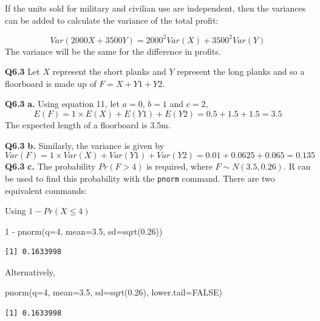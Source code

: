 \documentclass[
  oneside]{krantz}
\newenvironment{Shaded}{\begin{snugshade}}{\end{snugshade}}
\newcommand{\AttributeTok}[1]{\textcolor[rgb]{0.77,0.63,0.00}{#1}}
\newcommand{\ConstantTok}[1]{\textcolor[rgb]{0.00,0.00,0.00}{#1}}
\newcommand{\DecValTok}[1]{\textcolor[rgb]{0.00,0.00,0.81}{#1}}
\newcommand{\FloatTok}[1]{\textcolor[rgb]{0.00,0.00,0.81}{#1}}
\newcommand{\FunctionTok}[1]{\textcolor[rgb]{0.00,0.00,0.00}{#1}}
\newcommand{\NormalTok}[1]{#1}
\newcommand{\SpecialCharTok}[1]{\textcolor[rgb]{0.00,0.00,0.00}{#1}}
\begin{document}
If the units sold for military and civilian use are independent, then the variances can be added to calculate the variance of the total profit:

\[Var(2000X + 3500Y) = 2000^2Var(X) + 3500^2Var(Y)\]
The variance will be the same for the difference in profits.

\textbf{Q6.3} Let \(X\) represent the short planks and \(Y\) represent the long planks and so a floorboard is made up of \(F = X + Y1 + Y2\).

\textbf{Q6.3} \textbf{a.} Using equation 11, let \(a=0\), \(b=1\) and \(c=2\),
\[E(F) = 1 \times E(X) + E(Y1) + E(Y2) = 0.5 + 1.5 + 1.5 = 3.5\]
The expected length of a floorboard is 3.5m.

\textbf{Q6.3} \textbf{b.} Similarly, the variance is given by
\[Var(F) = 1 \times Var(X) + Var(Y1) + Var(Y2) = 0.01 + 0.0625 + 0.065 = 0.135\]
\textbf{Q6.3} \textbf{c.} The probability \(Pr(F > 4)\) is required, where \(F \sim N(3.5, 0.26)\). R can be used to find this probability with the \texttt{pnorm} command. There are two equivalent commands:

Using \(1 - Pr(X \le 4)\)

\begin{Shaded}
\begin{Highlighting}[]
\DecValTok{1} \SpecialCharTok{{-}} \FunctionTok{pnorm}\NormalTok{(}\AttributeTok{q=}\DecValTok{4}\NormalTok{, }\AttributeTok{mean=}\FloatTok{3.5}\NormalTok{, }\AttributeTok{sd=}\FunctionTok{sqrt}\NormalTok{(}\FloatTok{0.26}\NormalTok{))}
\end{Highlighting}
\end{Shaded}

\begin{verbatim}
[1] 0.1633998
\end{verbatim}

Alternatively,

\begin{Shaded}
\begin{Highlighting}[]
\FunctionTok{pnorm}\NormalTok{(}\AttributeTok{q=}\DecValTok{4}\NormalTok{, }\AttributeTok{mean=}\FloatTok{3.5}\NormalTok{, }\AttributeTok{sd=}\FunctionTok{sqrt}\NormalTok{(}\FloatTok{0.26}\NormalTok{), }\AttributeTok{lower.tail=}\ConstantTok{FALSE}\NormalTok{)}
\end{Highlighting}
\end{Shaded}

\begin{verbatim}
[1] 0.1633998
\end{verbatim}
\end{document}
